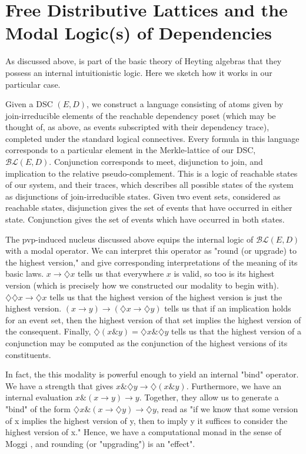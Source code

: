 \documentclass[hoptionsi,review,format=acmsmall]{acmart}
\theoremstyle{definition}
\newcommand{\BLc}{\mathcal{BL}}
\newcommand{\band}{\mathbin{\&}}
\newcommand{\Dia}{\diamondsuit}
\begin{document}
\section{Free Distributive Lattices and the Modal Logic(s) of Dependencies}
As discussed above, is part of the basic theory of Heyting algebras that they possess an internal intuitionistic logic. Here we sketch how it works in our particular case.

Given a DSC \((E,D)\), we construct a language consisting of atoms given by join-irreducible elements of the reachable dependency poset (which may be thought of, as above, as events subscripted with their dependency trace), completed under the standard logical connectives. Every formula in this language corresponds to a particular element in the Merkle-lattice of our DSC, \(\BLc(E,D)\).  Conjunction corresponds to meet, disjunction to join, and implication to the relative pseudo-complement. This is a logic of reachable states of our system, and their traces, which describes all possible states of the system as disjunctions of join-irreducible states. Given two event sets, considered as reachable states, disjunction gives the set of events that have occurred in either state. Conjunction gives the set of events which have occurred in both states.


The pvp-induced nucleus discussed above equips the internal logic of \(\BLc(E,D)\) with a modal operator. We can interpret this operator as "round (or upgrade) to the highest version," and give corresponding interpretations of the meaning of its basic laws. \(x \rightarrow \Dia{x}\) tells us that everywhere \(x\) is valid, so too is its highest version (which is precisely how we constructed our modality to begin with). \(\Dia\Dia{x} \rightarrow \Dia{x}\) tells us that the highest version of the highest version is just the highest version. \((x \rightarrow y) \rightarrow (\Dia{x} \rightarrow \Dia{y})\)  tells us that if an implication holds for an event set, then the highest version of that set implies the highest version of the consequent. Finally, \(\Dia(x \band y) = \Dia{x} \band \Dia{y}\) tells us that the highest version of a conjunction may be computed as the conjunction of the highest versions of its constituents.

In fact, the this modality is powerful enough to yield an internal "bind" operator. We have a strength that gives \(x \band \Dia{y} \rightarrow \Dia(x \band y)\). Furthermore, we have an internal evaluation \(x \band (x \rightarrow y) \rightarrow y\). Together, they allow us to generate a "bind" of the form \(\Dia{x} \band (x \rightarrow \Dia{y}) \rightarrow \Dia{y}\), read as "if we know that some version of x implies the highest version of y, then to imply y it suffices to consider the highest version of x." Hence, we have a computational monad in the sense of Moggi \cite{moggi1991notions}, and rounding (or "upgrading") is an "effect". 
\end{document}
